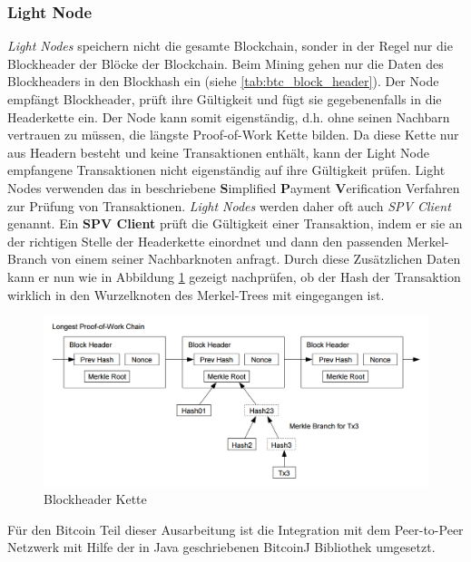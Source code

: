 \subsubsection{Light Node}
\textit{Light Nodes} speichern nicht die gesamte Blockchain, sonder in der Regel nur die Blockheader der Blöcke der Blockchain. Beim Mining gehen nur die Daten des Blockheaders in den Blockhash ein (siehe \ref{tab:btc_block_header}). Der Node empfängt Blockheader, prüft ihre Gültigkeit und fügt sie gegebenenfalls in die Headerkette ein. Der Node kann somit eigenständig, d.h. ohne seinen Nachbarn vertrauen zu müssen, die längste Proof-of-Work Kette bilden. Da diese Kette nur aus Headern besteht und keine Transaktionen enthält, kann der Light Node empfangene Transaktionen nicht eigenständig auf ihre Gültigkeit prüfen. Light Nodes verwenden das in \cite{bitcoin_white_paper} beschriebene \textbf{S}implified \textbf{P}ayment \textbf{V}erification Verfahren zur Prüfung von Transaktionen. \textit{Light Nodes} werden daher oft auch \textit{SPV Client} genannt. Ein \textbf{SPV Client} prüft die Gültigkeit einer Transaktion, indem er sie an der richtigen Stelle der Headerkette einordnet und dann den passenden Merkel-Branch von einem seiner Nachbarknoten anfragt. Durch diese Zusätzlichen Daten kann er nun wie in Abbildung \ref{fig:spv_chain}\citep{ethereum_white_paper} gezeigt nachprüfen, ob der Hash der Transaktion wirklich in den Wurzelknoten des Merkel-Trees mit eingegangen ist.

\begin{figure}[H]
\centering
\includegraphics[width=1\linewidth]{Figures/umsetzung_btc/spv_chain}
\decoRule
\caption{Blockheader Kette}
\label{fig:spv_chain}
\end{figure}

Für den Bitcoin Teil dieser Ausarbeitung ist die Integration mit dem Peer-to-Peer Netzwerk mit Hilfe der in Java geschriebenen BitcoinJ\cite{bitcoinj} Bibliothek umgesetzt.

